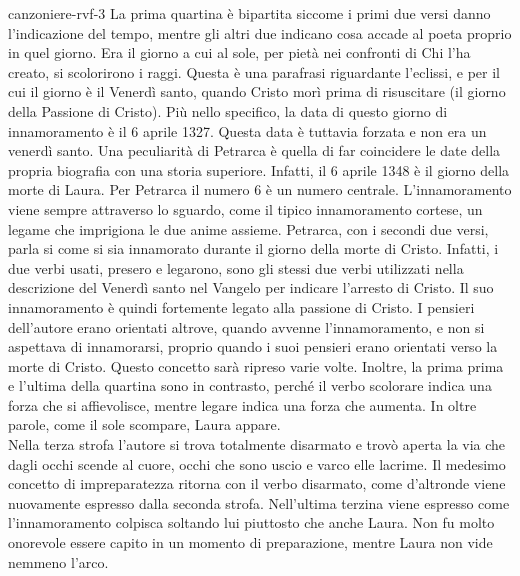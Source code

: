 \documentclass[preview]{standalone}
\begin{document}
\begin{snippet}{canzoniere-rvf-3}
    La prima quartina è bipartita siccome i primi due versi danno l'indicazione del tempo,
    mentre gli altri due indicano cosa accade al poeta proprio in quel giorno.
    Era il giorno a cui al sole, per pietà nei confronti di Chi l'ha creato, si scolorirono i raggi.
    Questa è una parafrasi riguardante l'eclissi, e per il cui il giorno è il Venerdì santo, quando
    Cristo morì prima di risuscitare (il giorno della Passione di Cristo).
    Più nello specifico, la data di questo giorno di innamoramento è il 6 aprile 1327.
    Questa data è tuttavia forzata e non era un venerdì santo.
    Una peculiarità di Petrarca è quella di far coincidere le date della propria biografia
    con una storia superiore. Infatti, il 6 aprile 1348 è il giorno della morte di Laura.
    Per Petrarca il numero 6 è un numero centrale.
    L'innamoramento viene sempre attraverso lo sguardo, come il tipico innamoramento cortese,
    un legame che imprigiona le due anime assieme.
    Petrarca, con i secondi due versi, parla si come si sia innamorato durante il giorno della morte di Cristo.
    Infatti, i due verbi usati, presero e legarono, sono gli stessi due verbi utilizzati nella descrizione
    del Venerdì santo nel Vangelo per indicare l'arresto di Cristo.
    Il suo innamoramento è quindi fortemente legato alla passione di Cristo.
    I pensieri dell'autore erano orientati altrove, quando avvenne l'innamoramento, e non si aspettava
    di innamorarsi, proprio quando i suoi pensieri erano orientati verso la morte di Cristo.
    Questo concetto sarà ripreso varie volte.
    Inoltre, la prima prima e l'ultima della quartina sono in contrasto, perché il verbo scolorare
    indica una forza che si affievolisce, mentre legare indica una forza che aumenta.
    In oltre parole, come il sole scompare, Laura appare. \\
    Nella terza strofa l'autore si trova totalmente disarmato e trovò aperta la via
    che dagli occhi scende al cuore, occhi che sono uscio e varco elle lacrime.
    Il medesimo concetto di impreparatezza ritorna con il verbo disarmato, come d'altronde viene
    nuovamente espresso dalla seconda strofa.
    Nell'ultima terzina viene espresso come
    l'innamoramento colpisca soltando lui piuttosto che anche Laura.
    Non fu molto onorevole essere capito in un momento di preparazione, mentre
    Laura non vide nemmeno l'arco.

\end{snippet}
\end{document}
